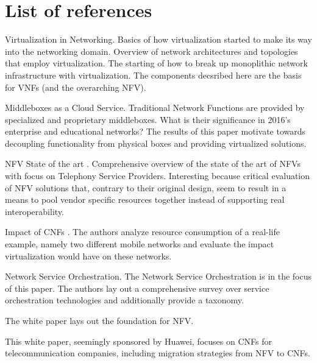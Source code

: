\section{List of references}
\begin{description}[style=sameline, leftmargin=1em, font=\normalfont]
	\item[Pfaff \cite{pfaff2009extending}]  Virtualization in Networking. Basics of how virtualization started to make its way into the networking domain. Overview of network architectures and topologies that employ virtualization. The starting of how to break up monoplithic network infrastructure with virtualization. The components decsribed here are the basis for VNFs (and the overarching NFV). 
	
	\item[Sherry \cite{sherry2016middleboxes}] Middleboxes as a Cloud Service. Traditional Network Functions are provided by specialized and proprietary middleboxes. What is their significance in 2016's enterprise and educational networks? The results of this paper motivate towards decoupling functionality from physical boxes and providing virtualized solutions.
	
	\item [Mijumbi \cite{mijumbi2016network}] NFV State of the art . Comprehensive overview of the state of the art of NFVs with focus on Telephony Service Providers. Interesting because critical evaluation of NFV solutions that, contrary to their original design, seem to result in a means to pool vendor specific resources together instead of supporting real interoperability. 
	
	\item [Bilal \cite{bilal2016impact}] Impact of CNFs . The authors analyze resource consumption of a real-life example, namely two different mobile networks and evaluate the impact virtualization would have on these networks. 
	
	\item [De Sousa \cite{de2019network}] Network Service Orchestration. The Network Service Orchestration is in the focus of this paper. The authors lay out a comprehensive survey over service orchestration technologies and additionally provide a taxonomy.  
	
	\item[NFV White Paper \cite{nfv_wp}]  The white paper lays out the foundation for NFV. 
	
	\item [AM White Paper \cite{evolutionnfv}] This white paper, seemingly sponsored by  Huawei, focuses on CNFs for telecommunication companies, including migration strategies from NFV to CNFs. 
	

\end{description}
